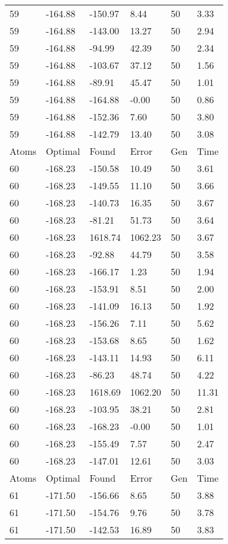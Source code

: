 \documentclass{report}
\begin{document}
\begin{appendix}
\begin{longtable}{llllll}
59 & -164.88 & -150.97 & 8.44 & 50 & 3.33 \\
59 & -164.88 & -143.00 & 13.27 & 50 & 2.94 \\
59 & -164.88 & -94.99 & 42.39 & 50 & 2.34 \\
59 & -164.88 & -103.67 & 37.12 & 50 & 1.56 \\
59 & -164.88 & -89.91 & 45.47 & 50 & 1.01 \\
59 & -164.88 & -164.88 & -0.00 & 50 & 0.86 \\
59 & -164.88 & -152.36 & 7.60 & 50 & 3.80 \\
59 & -164.88 & -142.79 & 13.40 & 50 & 3.08 \\
Atoms & Optimal & Found & Error & Gen & Time \\
60 & -168.23 & -150.58 & 10.49 & 50 & 3.61 \\
60 & -168.23 & -149.55 & 11.10 & 50 & 3.66 \\
60 & -168.23 & -140.73 & 16.35 & 50 & 3.67 \\
60 & -168.23 & -81.21 & 51.73 & 50 & 3.64 \\
60 & -168.23 & 1618.74 & 1062.23 & 50 & 3.67 \\
60 & -168.23 & -92.88 & 44.79 & 50 & 3.58 \\
60 & -168.23 & -166.17 & 1.23 & 50 & 1.94 \\
60 & -168.23 & -153.91 & 8.51 & 50 & 2.00 \\
60 & -168.23 & -141.09 & 16.13 & 50 & 1.92 \\
60 & -168.23 & -156.26 & 7.11 & 50 & 5.62 \\
60 & -168.23 & -153.68 & 8.65 & 50 & 1.62 \\
60 & -168.23 & -143.11 & 14.93 & 50 & 6.11 \\
60 & -168.23 & -86.23 & 48.74 & 50 & 4.22 \\
60 & -168.23 & 1618.69 & 1062.20 & 50 & 11.31 \\
60 & -168.23 & -103.95 & 38.21 & 50 & 2.81 \\
60 & -168.23 & -168.23 & -0.00 & 50 & 1.01 \\
60 & -168.23 & -155.49 & 7.57 & 50 & 2.47 \\
60 & -168.23 & -147.01 & 12.61 & 50 & 3.03 \\
Atoms & Optimal & Found & Error & Gen & Time \\
61 & -171.50 & -156.66 & 8.65 & 50 & 3.88 \\
61 & -171.50 & -154.76 & 9.76 & 50 & 3.78 \\
61 & -171.50 & -142.53 & 16.89 & 50 & 3.83 \\

\end{longtable}
\end{appendix}
\end{document}
